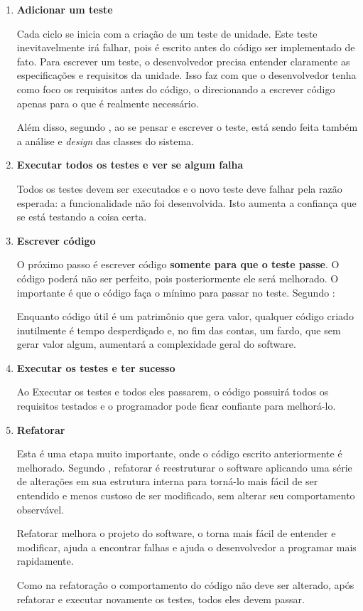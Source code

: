 \begin{enumerate}
\item \textbf{Adicionar um teste}

Cada ciclo se inicia com a criação de um teste de unidade. Este teste inevitavelmente irá falhar, pois é escrito antes do código ser implementado de fato. Para escrever um teste, o desenvolvedor precisa entender claramente as especificações e requisitos da unidade. Isso faz com que o desenvolvedor tenha como foco os requisitos antes do código, o direcionando a escrever código apenas para o que é realmente necessário.

Além disso, segundo , ao se pensar e escrever o teste, está sendo feita também a análise e \textit{design} das classes do sistema.

\item \textbf{Executar todos os testes e ver se algum falha}

Todos os testes devem ser executados e o novo teste deve falhar pela razão esperada: a funcionalidade não foi desenvolvida. Isto aumenta a confiança que se está testando a coisa certa.

\item \textbf{Escrever código}

O próximo passo é escrever código \textbf{somente para que o teste passe}. O código poderá não ser perfeito, pois posteriormente ele será melhorado. O importante é que o código faça o mínimo para passar no teste. Segundo :

\begin{citacao}
Enquanto código útil é um patrimônio que gera valor, qualquer código criado inutilmente é tempo desperdiçado e, no fim das contas, um fardo, que sem gerar valor algum, aumentará a complexidade geral do software.
\end{citacao}

\item \textbf{Executar os testes e ter sucesso}

Ao Executar os testes e todos eles passarem, o código possuirá todos os requisitos testados e o programador pode ficar confiante para melhorá-lo.

\item \textbf{Refatorar}

Esta é uma etapa muito importante, onde o código escrito anteriormente é melhorado. Segundo , refatorar é reestruturar o software aplicando uma série de alterações em sua estrutura interna para torná-lo mais fácil de ser entendido e menos custoso de ser modificado, sem alterar seu comportamento observável.

Refatorar melhora o projeto do software, o torna mais fácil de entender e modificar, ajuda a encontrar falhas e ajuda o desenvolvedor a programar mais rapidamente.

Como na refatoração o comportamento do código não deve ser alterado, após refatorar e executar novamente os testes, todos eles devem passar.

\end{enumerate}

